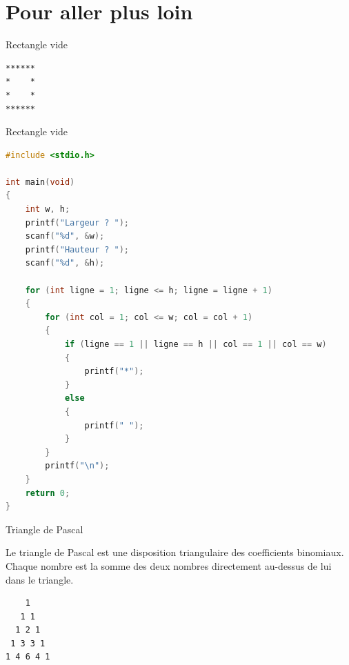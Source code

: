 \section{Pour aller plus loin}

\begin{UPSTIexercice}{Rectangle vide}
    \begin{minipage}{0.8\textwidth}
    \end{minipage}%
    \hfill
    \begin{minipage}{0.1\textwidth}
        \begin{verbatim}
******
*    *
*    *
******
        \end{verbatim}
    \end{minipage}
\end{UPSTIexercice}

\begin{UPSTIprofOnlyEnv}
    \begin{UPSTIcorrectionP}{Rectangle vide}
        \begin{lstlisting}[language=C]
#include <stdio.h>

int main(void)
{
    int w, h;
    printf("Largeur ? ");
    scanf("%d", &w);
    printf("Hauteur ? ");
    scanf("%d", &h);

    for (int ligne = 1; ligne <= h; ligne = ligne + 1)
    {
        for (int col = 1; col <= w; col = col + 1)
        {
            if (ligne == 1 || ligne == h || col == 1 || col == w)
            {
                printf("*");
            }
            else
            {
                printf(" ");
            }
        }
        printf("\n");
    }
    return 0;
}
        \end{lstlisting}
    \end{UPSTIcorrectionP}
\end{UPSTIprofOnlyEnv}


\begin{UPSTIexercice}{Triangle de Pascal}
    \begin{minipage}{0.8\textwidth}
        Le triangle de Pascal est une disposition triangulaire des coefficients binomiaux. Chaque nombre est la somme des deux nombres directement au-dessus de lui dans le triangle.
    \end{minipage}
    \hfill
    \begin{minipage}{0.15\textwidth}
        \begin{verbatim}
    1
   1 1
  1 2 1
 1 3 3 1
1 4 6 4 1
        \end{verbatim}
    \end{minipage}
\end{UPSTIexercice}

